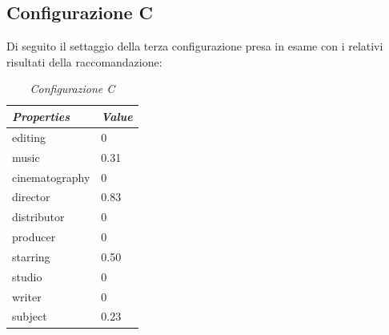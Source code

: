 \subsection{Configurazione C}
Di seguito il settaggio della terza configurazione presa in esame con i relativi risultati della raccomandazione: 
\begin{table}[H]
	\small
	\centering
	\begin{tabular}{l l}
		\textit{Properties} & \textit{Value} \\\hline
		editing & 0 \\
		music & 0.31 \\
		cinematography & 0\\
		director & 0.83\\
		distributor & 0\\
		producer & 0 \\
		starring & 0.50\\
		studio & 0\\
		writer & 0\\
		subject & 0.23\\
	\end{tabular}
	\caption{\emph{Configurazione C}}
\end{table}

